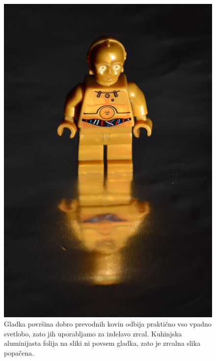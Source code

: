 \begin{figure}[ht]
\centering
\includegraphics[width=6truecm]{slike/04_photos_kovina.jpg}
\caption{Gladka površina dobro prevodnih kovin odbija praktično 
vso vpadno svetlobo, zato jih uporabljamo za izdelavo zrcal. Kuhinjska aluminijasta
folija na sliki ni povsem gladka, zato je zrcalna slika popačena.}
\label{fig:04_KovinaFoto}
\end{figure}
